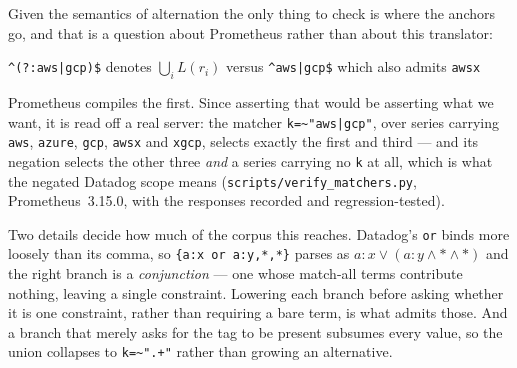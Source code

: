 \begin{remark}\label{rem:disjunction-detail}
Given the semantics of alternation the only thing to check is where the anchors go, and
that is a question about Prometheus rather than about this translator:
\begin{center}\footnotesize
\texttt{\textasciicircum(?:aws|gcp)\$} \quad denotes $\textstyle\bigcup_i L(r_i)$
\qquad versus \qquad
\texttt{\textasciicircum aws|gcp\$} \quad which also admits \texttt{awsx}
\end{center}
Prometheus compiles the first. Since asserting that would be asserting what we want, it
is read off a real server: the matcher \texttt{k=\textasciitilde{}"aws|gcp"}, over series
carrying \texttt{aws}, \texttt{azure}, \texttt{gcp}, \texttt{awsx} and \texttt{xgcp},
selects exactly the first and third --- and its negation selects the other three
\emph{and} a series carrying no \texttt{k} at all, which is what the negated Datadog
scope means (\texttt{scripts/verify\_matchers.py}, Prometheus~3.15.0, with the responses
recorded and regression-tested).

Two details decide how much of the corpus this reaches. Datadog's \texttt{or} binds
more loosely than its comma, so \texttt{\{a:x or a:y,*,*\}} parses as
$a{:}x \vee (a{:}y \wedge * \wedge *)$ and the right branch is a \emph{conjunction} ---
one whose match-all terms contribute nothing, leaving a single constraint. Lowering each
branch before asking whether it is one constraint, rather than requiring a bare term,
is what admits those. And a branch that merely asks for the tag to be present subsumes
every value, so the union collapses to
\texttt{k=\textasciitilde{}".+"} rather than growing an alternative.
\end{remark}
